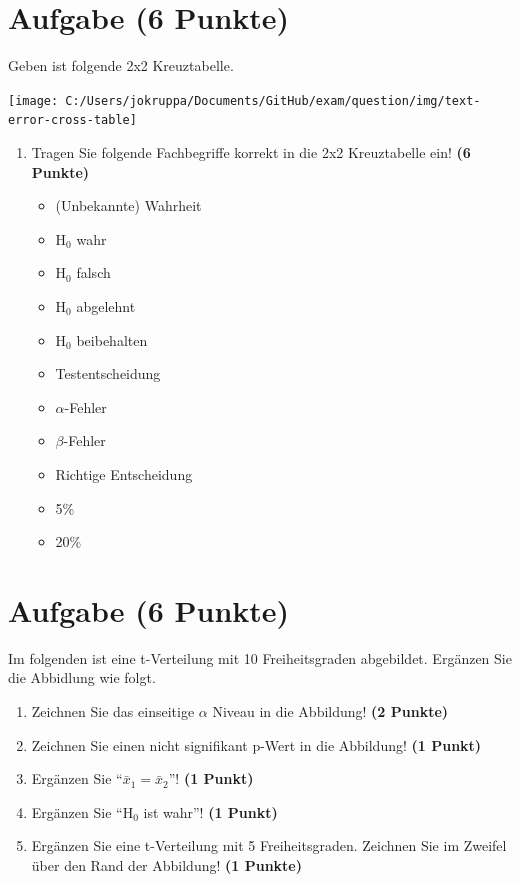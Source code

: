 \documentclass[a4paper, 10pt]{scrartcl}\usepackage[]{graphicx}\usepackage[]{color}
\begin{document}
\section{Aufgabe \hfill (6 Punkte)}



Geben ist folgende 2x2 Kreuztabelle. 

\begin{center}
  \texttt{[image: C:/Users/jokruppa/Documents/GitHub/exam/question/img/text-error-cross-table]}
\end{center}

\begin{enumerate}
\item Tragen Sie folgende Fachbegriffe korrekt in die 2x2 Kreuztabelle ein! \textbf{(6 Punkte)}
  \begin{itemize}
  \item (Unbekannte) Wahrheit	
  \item H$_0$ wahr
  \item H$_0$ falsch
  \item H$_0$ abgelehnt
  \item H$_0$ beibehalten
  \item Testentscheidung
  \item $\alpha$-Fehler
  \item $\beta$-Fehler
  \item Richtige Entscheidung
  \item 5\%
  \item 20\%
  \end{itemize}
\end{enumerate}



 
\clearpage

\section{Aufgabe \hfill (6 Punkte)}



Im folgenden ist eine t-Verteilung mit 10 Freiheitsgraden
abgebildet. Erg{\"a}nzen Sie die Abbidlung wie folgt.

\begin{enumerate}
\item Zeichnen Sie das einseitige $\alpha$ Niveau in die Abbildung! \textbf{(2 Punkte)} 
\item Zeichnen Sie einen nicht signifikant p-Wert in die Abbildung! \textbf{(1 Punkt)} 
\item Erg{\"a}nzen Sie "`$\bar{x}_1 = \bar{x}_2$"'! \textbf{(1 Punkt)} 
\item Erg{\"a}nzen Sie "`H$_0$ ist wahr"'! \textbf{(1 Punkt)} 
\item Erg{\"a}nzen Sie eine t-Verteilung mit 5
  Freiheitsgraden. Zeichnen Sie im Zweifel {\"u}ber den Rand der Abbildung! \textbf{(1 Punkte)} 
\end{enumerate}
\end{document}
